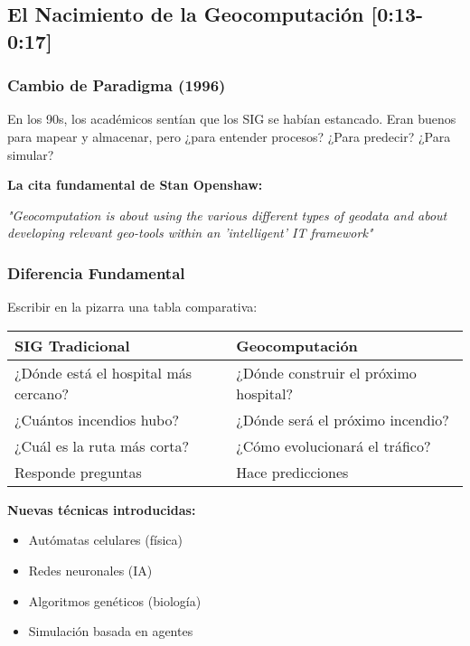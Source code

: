 \documentclass[11pt,a4paper]{article}
\newcommand{\tiempo}[1]{\textcolor{timecolor}{\textbf{[#1]}}}
\newcommand{\decir}[1]{\begin{tcolorbox}[colback=blue!5,colframe=usachblue,title={DECIR}]#1\end{tcolorbox}}
\newcommand{\hacer}[1]{\begin{tcolorbox}[colback=green!5,colframe=green!50!black,title={HACER}]#1\end{tcolorbox}}
\begin{document}
\subsection{El Nacimiento de la Geocomputación \tiempo{0:13-0:17}}

\subsubsection{Cambio de Paradigma (1996)}

\decir{En los 90s, los académicos sentían que los SIG se habían estancado. Eran buenos para mapear y almacenar, pero ¿para entender procesos? ¿Para predecir? ¿Para simular?}

\textbf{La cita fundamental de Stan Openshaw:}

\begin{mdframed}[backgroundcolor=blue!10]
\textit{"Geocomputation is about using the various different types of geodata and about developing relevant geo-tools within an 'intelligent' IT framework"}
\end{mdframed}

\subsubsection{Diferencia Fundamental}

\hacer{Escribir en la pizarra una tabla comparativa:}

\begin{center}
\begin{tabular}{|l|l|}
\hline
\textbf{SIG Tradicional} & \textbf{Geocomputación} \\
\hline
¿Dónde está el hospital más cercano? & ¿Dónde construir el próximo hospital? \\
¿Cuántos incendios hubo? & ¿Dónde será el próximo incendio? \\
¿Cuál es la ruta más corta? & ¿Cómo evolucionará el tráfico? \\
Responde preguntas & Hace predicciones \\
\hline
\end{tabular}
\end{center}

\textbf{Nuevas técnicas introducidas:}
\begin{itemize}
    \item Autómatas celulares (física)
    \item Redes neuronales (IA)
    \item Algoritmos genéticos (biología)
    \item Simulación basada en agentes
\end{itemize}
\end{document}
